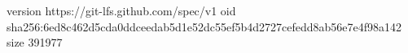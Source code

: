 version https://git-lfs.github.com/spec/v1
oid sha256:6ed8c462d5cda0ddceedab5d1e52dc55ef5b4d2727cefedd8ab56e7e4f98a142
size 391977
